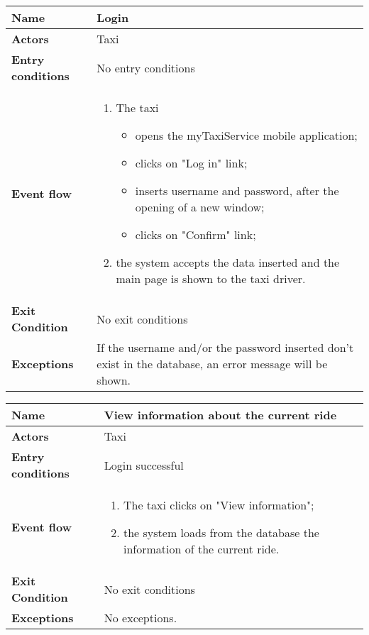 \vspace{20pt}
\noindent
\begin{tabular}{l l}
 \textbf {Name} & Login  \\ \hline
 \textbf{Actors} & Taxi \\ \hline
 \textbf{Entry conditions} & No entry conditions \\ \hline
 \textbf{Event flow} & 
 \parbox{0.9\textwidth}{
 \begin{enumerate}
 \item The taxi
    \begin{itemize}
    \item opens the myTaxiService mobile application;
    \item clicks on "Log in" link;
    \item inserts username and password, after the opening of a new window;
    \item clicks on "Confirm" link;
    \end{itemize}
 \item the system accepts the data inserted and the main page is shown to the taxi driver.
 \end{enumerate}
 } \\ \hline
 \textbf{Exit Condition} & No exit conditions \\ \hline
 \textbf{Exceptions} & \parbox{0.9\textwidth}{If the username and/or the password inserted don't exist in the database, an error message will be shown.}
\end{tabular}

\vspace{20pt}
\noindent
\begin{tabular}{l l}
 \textbf {Name} & View information about the current ride  \\ \hline
 \textbf{Actors} & Taxi \\ \hline
 \textbf{Entry conditions} & Login successful \\ \hline
 \textbf{Event flow} & 
 \parbox{0.9\textwidth}{
 \begin{enumerate}
 \item The taxi clicks on "View information";
 \item the system loads from the database the information of the current ride.
 \end{enumerate}
 } \\ \hline
 \textbf{Exit Condition} & No exit conditions \\ \hline
 \textbf{Exceptions} & No exceptions.
\end{tabular}

